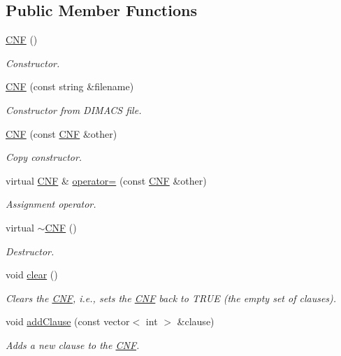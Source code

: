 \subsection*{Public Member Functions}
\begin{DoxyCompactItemize}
\item 
\hyperlink{classCNF_a69a2e604fd0dc79be4799ff90c7ef362}{C\-N\-F} ()
\begin{DoxyCompactList}\small\item\em Constructor. \end{DoxyCompactList}\item 
\hyperlink{classCNF_aa3bf8a4f0ea5c96c9833f34028e00347}{C\-N\-F} (const string \&filename)
\begin{DoxyCompactList}\small\item\em Constructor from D\-I\-M\-A\-C\-S file. \end{DoxyCompactList}\item 
\hyperlink{classCNF_acdf16631121bace295ef4440f8a38777}{C\-N\-F} (const \hyperlink{classCNF}{C\-N\-F} \&other)
\begin{DoxyCompactList}\small\item\em Copy constructor. \end{DoxyCompactList}\item 
virtual \hyperlink{classCNF}{C\-N\-F} \& \hyperlink{classCNF_aa61ef2c2b49d4182993ccbd0e7877322}{operator=} (const \hyperlink{classCNF}{C\-N\-F} \&other)
\begin{DoxyCompactList}\small\item\em Assignment operator. \end{DoxyCompactList}\item 
virtual \hyperlink{classCNF_abc31a76163fb0d56de79d2e228a3f3d1}{$\sim$\-C\-N\-F} ()
\begin{DoxyCompactList}\small\item\em Destructor. \end{DoxyCompactList}\item 
void \hyperlink{classCNF_aa6b76fdc15481f7899d71f7cc8fa5f45}{clear} ()
\begin{DoxyCompactList}\small\item\em Clears the \hyperlink{classCNF}{C\-N\-F}, i.\-e., sets the \hyperlink{classCNF}{C\-N\-F} back to T\-R\-U\-E (the empty set of clauses). \end{DoxyCompactList}\item 
void \hyperlink{classCNF_af3d87d407464eeda15426bdd75f15a7f}{add\-Clause} (const vector$<$ int $>$ \&clause)
\begin{DoxyCompactList}\small\item\em Adds a new clause to the \hyperlink{classCNF}{C\-N\-F}. \end{DoxyCompactList}\item 

\end{DoxyCompactItemize}
